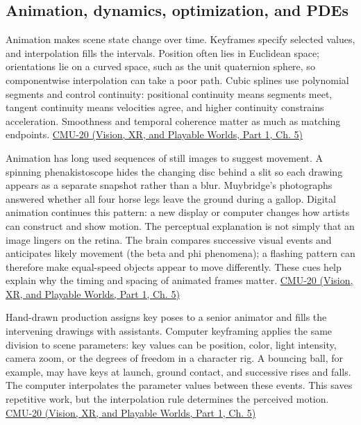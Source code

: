 \subsection{Animation, dynamics, optimization, and PDEs}\label{04-visual-computing-ii-ch029-animation-dynamics-optimization-and-pdes}

\hypertarget{04-visual-computing-ii-ch029-animation-dynamics-optimization-and-pdes}{}

Animation makes scene state change over time. Keyframes specify selected values, and interpolation fills the intervals. Position often lies in Euclidean space; orientations lie on a curved space, such as the unit quaternion sphere, so componentwise interpolation can take a poor path. Cubic splines use polynomial segments and control continuity: positional continuity means segments meet, tangent continuity means velocities agree, and higher continuity constrains acceleration. Smoothness and temporal coherence matter as much as matching endpoints. \href{../07-Vision-XR-and-Playable-Worlds-P01/main.pdf\#nameddest=04-visual-computing-ii-ch036-cmu-20---introduction-to-animation}{CMU-20 (Vision, XR, and Playable Worlds, Part 1, Ch. 5)}

Animation has long used sequences of still images to suggest movement. A spinning phenakistoscope hides the changing disc behind a slit so each drawing appears as a separate snapshot rather than a blur. Muybridge's photographs answered whether all four horse legs leave the ground during a gallop. Digital animation continues this pattern: a new display or computer changes how artists can construct and show motion. The perceptual explanation is not simply that an image lingers on the retina. The brain compares successive visual events and anticipates likely movement (the beta and phi phenomena); a flashing pattern can therefore make equal-speed objects appear to move differently. These cues help explain why the timing and spacing of animated frames matter. \href{../07-Vision-XR-and-Playable-Worlds-P01/main.pdf\#nameddest=04-visual-computing-ii-ch036-cmu-20---introduction-to-animation}{CMU-20 (Vision, XR, and Playable Worlds, Part 1, Ch. 5)}

Hand-drawn production assigns key poses to a senior animator and fills the intervening drawings with assistants. Computer keyframing applies the same division to scene parameters: key values can be position, color, light intensity, camera zoom, or the degrees of freedom in a character rig. A bouncing ball, for example, may have keys at launch, ground contact, and successive rises and falls. The computer interpolates the parameter values between these events. This saves repetitive work, but the interpolation rule determines the perceived motion. \href{../07-Vision-XR-and-Playable-Worlds-P01/main.pdf\#nameddest=04-visual-computing-ii-ch036-cmu-20---introduction-to-animation}{CMU-20 (Vision, XR, and Playable Worlds, Part 1, Ch. 5)}

